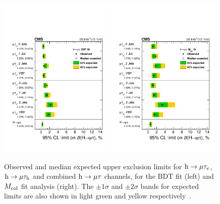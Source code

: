 \begin{figure}[!htpb]\centering
   \captionsetup{width=.96\textwidth,justification=centering}
 \includegraphics[width=0.49\textwidth]{plots_and_figures/chapter8/h125/brazilflagBDT.pdf}
 \includegraphics[width=0.49\textwidth]{plots_and_figures/chapter8/h125/brazilflagmcol.pdf} \\
 \caption{Observed and median expected upper exclusion limits for $\text{h} \to \mu \tau_{e}$, $\text{h} \to \mu \tau_{\text{h}}$ and combined $\text{h} \to \mu \tau$ channels, for the BDT fit (left) and $M_{\text{col}}$ fit analysis (right). The $\pm 1 \sigma$ and $\pm 2 \sigma$ bands for expected limits are also shown in light green and yellow respectively~\cite{HIG-17-001}.}
 \label{fig:hmue_limits_brazil}
\end{figure}

